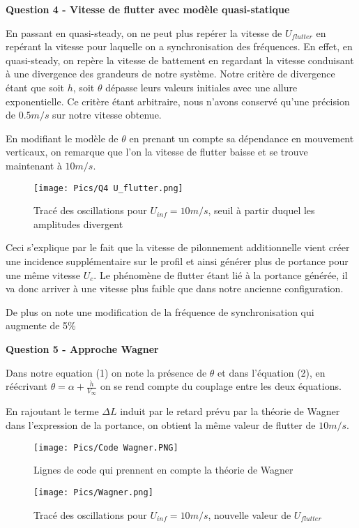 \documentclass[conference]{IEEEtran}
\begin{document}
\textbf{Question 4 - Vitesse de flutter avec modèle quasi-statique }

En passant en quasi-steady, on ne peut plus repérer la vitesse de $U_{flutter}$ en repérant la vitesse pour laquelle on a synchronisation des fréquences. En effet, en quasi-steady, on repère la vitesse de battement en regardant la vitesse conduisant à une divergence des grandeurs de notre système. Notre critère de divergence étant que soit $h$, soit $\theta$ dépasse leurs valeurs initiales avec une allure exponentielle.  Ce critère étant arbitraire, nous n'avons conservé qu'une précision de $0.5m/s $ sur notre vitesse obtenue. 

En modifiant le modèle de $\theta$ en prenant un compte sa dépendance en mouvement verticaux, on remarque que l'on la vitesse de flutter baisse et se trouve maintenant à $10m/s$.

\begin{figure}[H]
  \texttt{[image: Pics/Q4 U\_flutter.png]}
  \caption{Tracé des oscillations pour $U_{inf} = 10m/s$, seuil à partir duquel les amplitudes divergent}
  \label{fig:boat1}
\end{figure}

Ceci s'explique par le fait que la vitesse de pilonnement additionnelle vient créer une incidence supplémentaire sur le profil et ainsi générer plus de portance pour une même vitesse $U_c$. Le phénomène de flutter étant lié à la portance générée, il va donc arriver à une vitesse plus faible que dans notre ancienne configuration. 

De plus on note une modification de la fréquence de synchronisation qui augmente de 5\% 


\textbf{Question 5 - Approche Wagner}

Dans notre equation (1) on note la présence de $\theta$ et dans l'équation (2), en réécrivant $\theta = \alpha + \frac{\dot h }{V_\infty}$ on se rend compte du couplage entre les deux équations.

En rajoutant le terme $\Delta L$ induit par le retard prévu par la théorie de Wagner dans l'expression de la portance, on obtient la même valeur de flutter de $10m/s$.

\begin{figure}[H]
  \texttt{[image: Pics/Code Wagner.PNG]}
  \caption{Lignes de code qui prennent en compte la théorie de Wagner}
  \label{fig:boat1}
\end{figure}

\begin{figure}[H]
  \texttt{[image: Pics/Wagner.png]}
  \caption{Tracé des oscillations pour $U_{inf} = 10m/s$, nouvelle valeur de $U_{flutter}$}
  \label{fig:boat1}
\end{figure}
\end{document}
